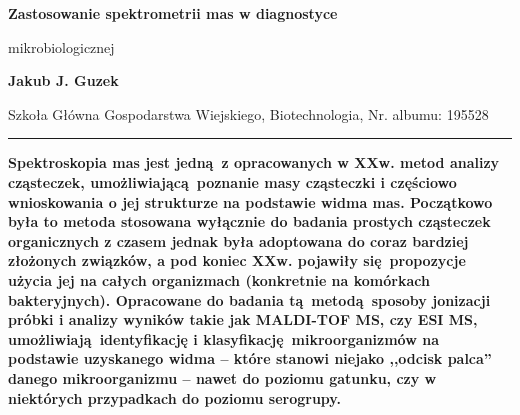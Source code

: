 \documentclass[two column, twoside, a4paper]{article}
\begin{document}
\begin{strip}
	{\sc \bfseries \LARGE {}\selectfont Zastosowanie spektrometrii mas w diagnostyce

	\vspace{2pt} mikrobiologicznej} \vspace{\baselineskip}

{\bfseries \large Jakub J. Guzek}

{Szkoła Główna Gospodarstwa Wiejskiego, Biotechnologia, Nr. albumu: 195528}\vspace{\baselineskip}

\hrule
\end{strip}

\textbf{Spektroskopia mas jest jedną z opracowanych w XXw. metod analizy cząsteczek, umożliwiającą poznanie masy cząsteczki i częściowo wnioskowania o jej strukturze na podstawie widma mas. Początkowo była to metoda stosowana wyłącznie do badania prostych cząsteczek organicznych z czasem jednak była adoptowana do coraz bardziej złożonych związków, a pod koniec XXw. pojawiły się propozycje użycia jej na całych organizmach (konkretnie na komórkach bakteryjnych). Opracowane do badania tą metodą sposoby jonizacji próbki i analizy wyników takie jak MALDI-TOF MS, czy ESI MS, umożliwiają identyfikację i klasyfikację mikroorganizmów na podstawie uzyskanego widma -- które stanowi niejako ,,odcisk palca'' danego mikroorganizmu -- nawet do poziomu gatunku, czy w niektórych przypadkach do poziomu serogrupy\autocite{Biswas2013}.}
\end{document}
